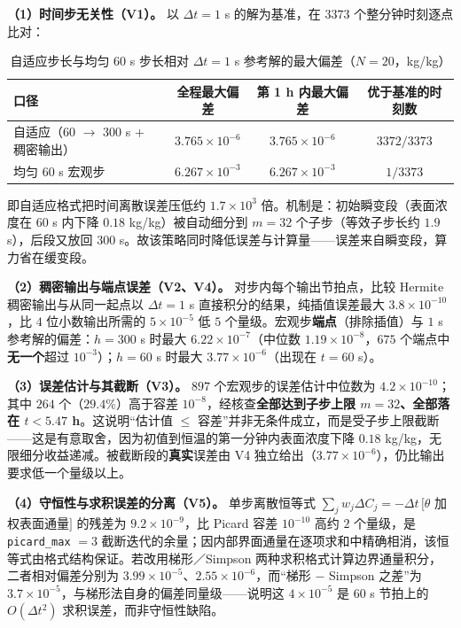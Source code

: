 \textbf{（1）时间步无关性（V1）。} 以 $\Delta t = 1$ s 的解为基准，在 $3373$ 个整分钟时刻逐点比对：

\begin{table}[H]
  \centering
  \caption{自适应步长与均匀 $60$ s 步长相对 $\Delta t = 1$ s 参考解的最大偏差（$N=20$，kg/kg）}
  \label{tab:p3_v1}
  \begin{tabular}{lccc}
    \toprule
    口径 & 全程最大偏差 & 第 1 h 内最大偏差 & 优于基准的时刻数 \\
    \midrule
    自适应（60 $\to$ 300 s $+$ 稠密输出） & $3.765\times10^{-6}$ & $3.765\times10^{-6}$ & $3372 / 3373$ \\
    均匀 $60$ s 宏观步                 & $6.267\times10^{-3}$ & $6.267\times10^{-3}$ & $1 / 3373$ \\
    \bottomrule
  \end{tabular}
\end{table}

即自适应格式把时间离散误差压低约 $1.7\times10^{3}$ 倍。机制是：初始瞬变段（表面浓度在 $60$ s 内下降 $0.18$ kg/kg）被自动细分到 $m=32$ 个子步（等效子步长约 $1.9$ s），后段又放回 $300$ s。故该策略同时降低误差与计算量——误差来自瞬变段，算力省在缓变段。

\textbf{（2）稠密输出与端点误差（V2、V4）。} 对步内每个输出节拍点，比较 Hermite 稠密输出与从同一起点以 $\Delta t=1$ s 直接积分的结果，纯插值误差最大 $3.8\times10^{-10}$，比 $4$ 位小数输出所需的 $5\times10^{-5}$ 低 $5$ 个量级。宏观步\textbf{端点}（排除插值）与 $1$ s 参考解的偏差：$h=300$ s 时最大 $6.22\times10^{-7}$（中位数 $1.19\times10^{-8}$，$675$ 个端点中\textbf{无一个}超过 $10^{-3}$）；$h=60$ s 时最大 $3.77\times10^{-6}$（出现在 $t=60$ s）。

\textbf{（3）误差估计与其截断（V3）。} $897$ 个宏观步的误差估计中位数为 $4.2\times10^{-10}$；其中 $264$ 个（$29.4\%$）高于容差 $10^{-8}$，经核查\textbf{全部达到子步上限 $m=32$、全部落在 $t<5.47$ h}。这说明“估计值 $\le$ 容差”并非无条件成立，而是受子步上限截断——这是有意取舍，因为初值到恒温的第一分钟内表面浓度下降 $0.18$ kg/kg，无限细分收益递减。被截断段的\textbf{真实}误差由 V4 独立给出（$3.77\times10^{-6}$），仍比输出要求低一个量级以上。

\textbf{（4）守恒性与求积误差的分离（V5）。} 单步离散恒等式 $\sum_j w_j\Delta C_j=-\Delta t\,[\theta$ 加权表面通量$]$ 的残差为 $9.2\times10^{-9}$，比 Picard 容差 $10^{-10}$ 高约 $2$ 个量级，是 \texttt{picard\_max} $=3$ 截断迭代的余量；因内部界面通量在逐项求和中精确相消，该恒等式由格式结构保证。若改用梯形／Simpson 两种求积格式计算边界通量积分，二者相对偏差分别为 $3.99\times10^{-5}$、$2.55\times10^{-6}$，而“梯形 $-$ Simpson 之差”为 $3.7\times10^{-5}$，与梯形法自身的偏差同量级——说明这 $4\times10^{-5}$ 是 $60$ s 节拍上的 $O(\Delta t^2)$ 求积误差，而非守恒性缺陷。

